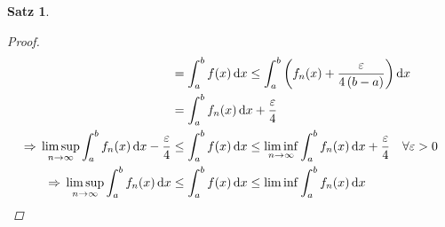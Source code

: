 \documentclass[11pt, twoside, a4paper]{article}
\theoremstyle{plain}
\newtheorem{satz}[blockelement]{Satz}
\numberwithin{equation}{subsection}
\newcommand{\pair}[1]{\left(#1\right)}
\newcommand{\of}[1]{\mathopen{}\mathclose{}\bgroup\left(#1\aftergroup\egroup\right)}
\newcommand{\impl}[0]{\Rightarrow{}}
\newcommand{\fromto}{\rightarrow{}}
\newcommand{\dif}{\mathop{}\!\mathrm{d}}
\newcommand{\ntoinf}[0]{n\fromto\infty}
\begin{document}
\begin{satz}
\begin{proof}
\begin{align*}
                &= \int_{a}^{b} f\of{x} \dif x \leq \int_{a}^{b} \pair{f_n\of{x} + \frac{\varepsilon}{4\pair{b-a}}} \dif x\\
                &= \int_{a}^{b} f_n\of{x} \dif x + \frac{\varepsilon}{4}\\
                \impl \limsup_{\ntoinf} \int_{a}^{b} f_n\of{x} \dif x - \frac{\varepsilon}{4} &\leq \int_{a}^{b} f\of{x} \dif x \leq \liminf_{\ntoinf} \int_{a}^{b} f_n\of{x} \dif x + \frac{\varepsilon}{4}\quad\forall\varepsilon > 0\\
                \impl \limsup_{\ntoinf} \int_{a}^{b} f_n\of{x} \dif x &\leq \int_{a}^{b} f\of{x} \dif x \leq \liminf \int_{a}^{b} f_n\of{x} \dif x\qedhere
            \end{align*}
        \end{proof}
    \end{satz}
\end{document}
